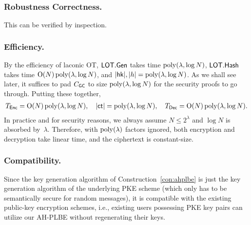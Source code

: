\subsubsection{Robustness Correctness.}
This can be verified by inspection.

\subsubsection{Efficiency.}
By the efficiency of laconic OT,
$\LOT.\Gen$ takes time $\operatorname{poly}(\lambda,\log N)$,
$\LOT.\Hash$ takes time $\operatorname{O}(N)\operatorname{poly}(\lambda,\log N)$, and
${|\hk|,|h|=\poly(\lambda,\log N)}$.
As we shall see later, it suffices to pad $C_\GC$ to size $\operatorname{poly}(\lambda,\log N)$ for the security proofs to go through.
Putting these together,
\begin{align*}
T_\Enc=\bigO(N)\poly(\lambda,\log N),
\WideNarrow{\quad}{\ \,}
|\ct|=\poly(\lambda,\log N),
\WideNarrow{\quad}{\ \,}
T_\Dec=\bigO(N)\poly(\lambda,\log N).
\end{align*}
In practice and for security reasons,
we always assume ${N\leq 2^\lambda}$ and ${\log N}$ is absorbed by~$\lambda$.
Therefore, with $\operatorname{poly}(\lambda)$ factors ignored,
both encryption and decryption take linear time,
and the ciphertext is constant-size.

\subsubsection{Compatibility.}
Since the key generation algorithm of Construction~\ref{con:ahplbe} is just the key generation algorithm of the underlying PKE scheme (which only has to be semantically secure for random messages),
it is compatible with the existing public-key encryption schemes,
i.e., existing users possessing PKE key pairs can utilize our AH-PLBE without regenerating their keys.
